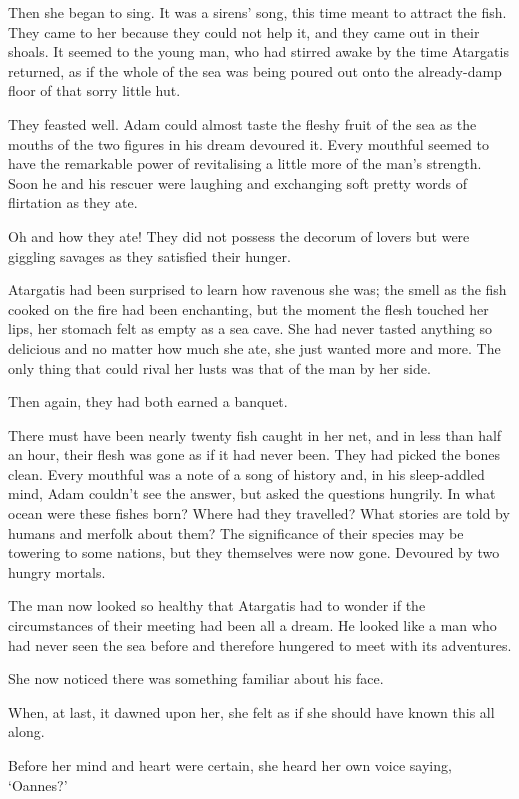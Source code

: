 Then she began to sing. It was a sirens’ song, this time meant to
attract the fish. They came to her because they could not help it, and
they came out in their shoals. It seemed to the young man, who had
stirred awake by the time Atargatis returned, %
as if the whole
of the sea was being poured out onto the already-damp floor of that
sorry little hut.

They feasted well. Adam could almost taste the fleshy fruit of the sea
as the mouths of the two figures in his dream devoured it. Every
mouthful seemed to have the remarkable power of revitalising a little
more of the man’s strength. Soon he and his rescuer were laughing and
exchanging soft pretty words of flirtation as they ate.

Oh and how they ate! They did not possess the decorum of lovers but
were giggling savages as they satisfied their hunger.

Atargatis had been surprised to learn how ravenous she was; the smell
as the fish cooked on the fire had been enchanting, but the moment the
flesh touched her lips, her stomach felt as empty as a sea cave. She
had never tasted anything so delicious and no matter how much she ate,
she just wanted more and more. The only thing that could rival her
lusts was that of the man by her side.

Then again, they had both earned a banquet.

There must have been nearly twenty fish caught in her net, and in less
than half an hour, their flesh was gone as if it had never been. They
had picked the bones clean. Every mouthful was a note of a song of
history and, in his sleep-addled mind, Adam couldn’t see the answer,
but asked the questions hungrily. In what ocean were these fishes
born? Where had they travelled? What stories are told by humans and
merfolk about them? The significance of their species may be towering
to some nations, but they themselves were now gone. Devoured by two
hungry mortals.

The man now looked so healthy that Atargatis had to wonder if the
circumstances of their meeting had been all a dream. He looked like a
man who had never seen the sea before and therefore hungered to meet
with its adventures.

She now noticed there was something familiar about his face.

When, at last, it dawned upon her, she felt as if she should have
known this all along.

Before her mind and heart were certain, she heard her own voice
saying, `Oannes?'

